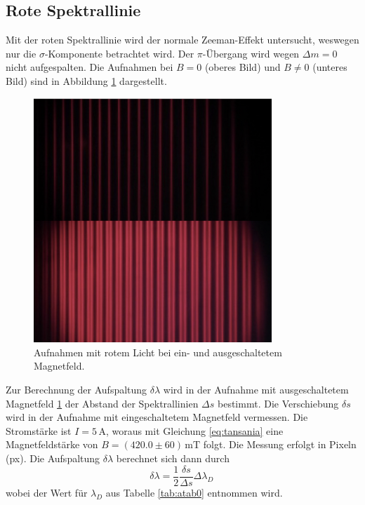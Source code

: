 \subsection{Rote Spektrallinie}
Mit der roten Spektrallinie wird der normale Zeeman-Effekt untersucht, weswegen nur die $\sigma$-Komponente betrachtet wird.
Der $\pi$-Übergang wird wegen $\Delta m = 0$ nicht aufgespalten.
Die Aufnahmen bei $B = 0$ (oberes Bild) und $B \neq 0$ (unteres Bild) sind in Abbildung \ref{fig:afig2} dargestellt.
\FloatBarrier
\begin{figure}
    \centering
    \includegraphics[width=0.8\textwidth]{rot.jpg}
    \caption{Aufnahmen mit rotem Licht bei ein- und ausgeschaltetem Magnetfeld.}
    \label{fig:afig2}
\end{figure}
\FloatBarrier
Zur Berechnung der Aufspaltung $\delta \lambda$ wird in der Aufnahme mit ausgeschaltetem Magnetfeld \ref{fig:afig2} der 
Abstand der Spektrallinien $\Delta s$ bestimmt. Die Verschiebung $\delta s$ wird in der Aufnahme mit eingeschaltetem 
Magnetfeld vermessen. Die Stromstärke ist $I = 5 \, \si{\ampere}$, woraus mit Gleichung \eqref{eq:tansania} eine Magnetfeldstärke
von $B = \left(420.0 \pm 60\right) \,\si{\milli\tesla}$ folgt. Die Messung erfolgt in Pixeln (px).
Die Aufspaltung $\delta \lambda$ berechnet 
sich dann durch
\begin{equation}
    \label{eq:Auswertung}
    \delta \lambda = \frac{1}{2} \frac{\delta s}{\Delta s} \Delta \lambda_D \,
\end{equation}
wobei der Wert für $\lambda_D$ aus Tabelle \ref{tab:atab0} entnommen wird. 
